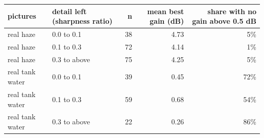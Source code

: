 \begin{tabular}{llrrr}
\toprule
pictures & detail left (sharpness ratio) & n & mean best gain (dB) & share with no gain above 0.5 dB \\
\midrule
real haze & 0.0 to 0.1 & 38 & 4.73 & 5\% \\
real haze & 0.1 to 0.3 & 72 & 4.14 & 1\% \\
real haze & 0.3 to above & 75 & 4.25 & 5\% \\
real tank water & 0.0 to 0.1 & 39 & 0.45 & 72\% \\
real tank water & 0.1 to 0.3 & 59 & 0.68 & 54\% \\
real tank water & 0.3 to above & 22 & 0.26 & 86\% \\
\bottomrule
\end{tabular}
